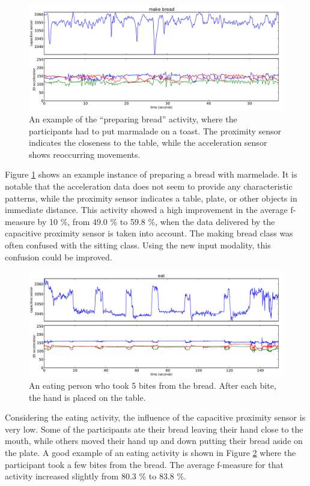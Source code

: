 \documentclass[runningheads,a4paper]{llncs}
\begin{document}
\begin{figure}[htpb]
	\centering
		\includegraphics[width=\textwidth]{../Auswertung/images/eugen_5.pdf}
	\caption{An example of the ``preparing bread'' activity, where the participants had to put marmalade on a toast. The proximity sensor indicates the closeness to the table, while the acceleration sensor shows reoccurring movements.}
	\label{fig:eugen_5}
\end{figure}

Figure \ref{fig:eugen_5} shows an example instance of preparing a bread with marmelade. It is notable that the acceleration data does not seem to provide any characteristic patterns, while the proximity sensor indicates a table, plate, or other objects in immediate distance. This activity showed a high improvement in the average f-measure by 10 \%, from 49.0 \% to 59.8 \%, when the data delivered by the capacitive proximity sensor is taken into account. The making bread class was often confused with the sitting class. Using the new input modality, this confusion could be improved.

\begin{figure}[htpb]
	\centering
		\includegraphics[width=\textwidth]{../Auswertung/images/eugen_6.pdf}
	\caption{An eating person who took 5 bites from the bread. After each bite, the hand is placed on the table.}
	\label{fig:eugen_6}
\end{figure}

Considering the eating activity, the influence of the capacitive proximity sensor is very low. Some of the participants ate their bread leaving their hand close to the mouth, while others moved their hand up and down putting their bread aside on the plate. A good example of an eating activity is shown in Figure \ref{fig:eugen_6} where the participant took a few bites from the bread. The average f-measure for that activity increased slightly from 80.3 \% to 83.8 \%. 
\end{document}
